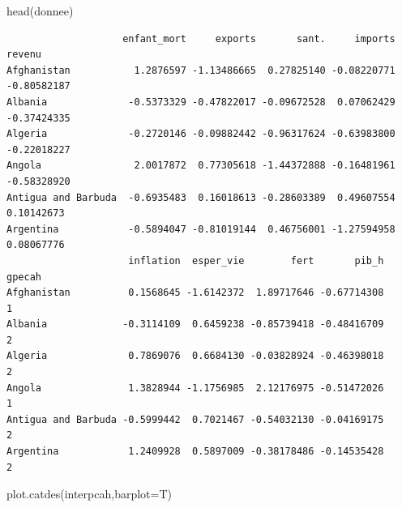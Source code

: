 \documentclass[
]{article}
\newenvironment{Shaded}{}{}
\newcommand{\AttributeTok}[1]{#1}
\newcommand{\FunctionTok}[1]{#1}
\newcommand{\NormalTok}[1]{#1}
\begin{document}
\begin{Shaded}
\begin{Highlighting}[]
\FunctionTok{head}\NormalTok{(donnee)}
\end{Highlighting}
\end{Shaded}

\begin{verbatim}
                    enfant_mort     exports       sant.     imports      revenu
Afghanistan           1.2876597 -1.13486665  0.27825140 -0.08220771 -0.80582187
Albania              -0.5373329 -0.47822017 -0.09672528  0.07062429 -0.37424335
Algeria              -0.2720146 -0.09882442 -0.96317624 -0.63983800 -0.22018227
Angola                2.0017872  0.77305618 -1.44372888 -0.16481961 -0.58328920
Antigua and Barbuda  -0.6935483  0.16018613 -0.28603389  0.49607554  0.10142673
Argentina            -0.5894047 -0.81019144  0.46756001 -1.27594958  0.08067776
                     inflation  esper_vie        fert       pib_h gpecah
Afghanistan          0.1568645 -1.6142372  1.89717646 -0.67714308      1
Albania             -0.3114109  0.6459238 -0.85739418 -0.48416709      2
Algeria              0.7869076  0.6684130 -0.03828924 -0.46398018      2
Angola               1.3828944 -1.1756985  2.12176975 -0.51472026      1
Antigua and Barbuda -0.5999442  0.7021467 -0.54032130 -0.04169175      2
Argentina            1.2409928  0.5897009 -0.38178486 -0.14535428      2
\end{verbatim}

\begin{Shaded}
\begin{Highlighting}[]
\FunctionTok{plot.catdes}\NormalTok{(interpcah,}\AttributeTok{barplot=}\NormalTok{T)}
\end{Highlighting}
\end{Shaded}
\end{document}
